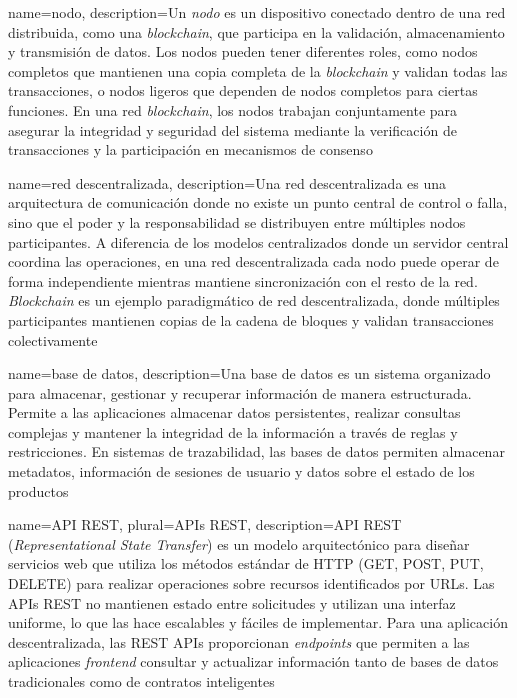 {
    name=nodo,
    description={Un \textit{nodo} es un dispositivo conectado dentro de una red distribuida, como una \textit{blockchain}, que participa en la validación, almacenamiento y transmisión de datos. Los nodos pueden tener diferentes roles, como nodos completos que mantienen una copia completa de la \textit{blockchain} y validan todas las transacciones, o nodos ligeros que dependen de nodos completos para ciertas funciones. En una red \textit{blockchain}, los nodos trabajan conjuntamente para asegurar la integridad y seguridad del sistema mediante la verificación de transacciones y la participación en mecanismos de consenso}
}

{
    name=red descentralizada,
    description={Una red descentralizada es una arquitectura de comunicación donde no existe un punto central de control o falla, sino que el poder y la responsabilidad se distribuyen entre múltiples nodos participantes. A diferencia de los modelos centralizados donde un servidor central coordina las operaciones, en una red descentralizada cada nodo puede operar de forma independiente mientras mantiene sincronización con el resto de la red. \textit{Blockchain} es un ejemplo paradigmático de red descentralizada, donde múltiples participantes mantienen copias de la cadena de bloques y validan transacciones colectivamente}
}

{
    name=base de datos,
    description={Una base de datos es un sistema organizado para almacenar, gestionar y recuperar información de manera estructurada. Permite a las aplicaciones almacenar datos persistentes, realizar consultas complejas y mantener la integridad de la información a través de reglas y restricciones. En sistemas de trazabilidad, las bases de datos permiten almacenar metadatos, información de sesiones de usuario y datos sobre el estado de los productos}
}

{
    name=API REST,
    plural=APIs REST,
    description={API REST (\textit{Representational State Transfer}) es un modelo arquitectónico para diseñar servicios web que utiliza los métodos estándar de HTTP (GET, POST, PUT, DELETE) para realizar operaciones sobre recursos identificados por URLs. Las APIs REST no mantienen estado entre solicitudes y utilizan una interfaz uniforme, lo que las hace escalables y fáciles de implementar. Para una aplicación descentralizada, las REST APIs proporcionan \textit{endpoints} que permiten a las aplicaciones \textit{frontend} consultar y actualizar información tanto de bases de datos tradicionales como de contratos inteligentes}
}

